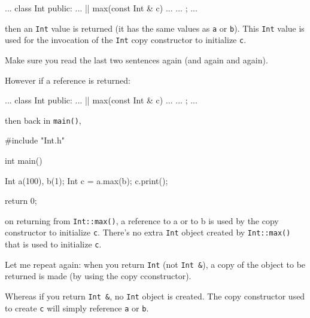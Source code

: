\begin{consolethree}[escapeinside=||]
...
class Int
{
public:
    ...
    || max(const Int & c)
    {
        ...
    }
    ...
};
...
\end{consolethree}

then an \texttt{Int} value is returned (it has the same values as \texttt{a}
or \texttt{b}). This \texttt{Int} value is used for the invocation of the
\texttt{Int} copy constructor to initialize \texttt{c}.

Make sure you read the last two sentences again (and again and again).

However if a reference is returned:

\begin{consolethree}[escapeinside=||]
...
class Int
{
public:
    ...
    || max(const Int & c)
    {
        ...
    }
    ...
};
...
\end{consolethree}

then back in \texttt{main()},
\begin{consolethree}
#include "Int.h"

int main()
{
    Int a(100), b(1);
    Int c = a.max(b);
    c.print();
    
    return 0;
}
\end{consolethree}

on returning from \texttt{Int::max()}, a reference to a or to b is used by
the copy constructor to initialize \texttt{c}. There's no
extra \texttt{Int} object created by \texttt{Int::max()} that is used to
initialize \texttt{c}.

Let me repeat again: when you return \texttt{Int} (not \texttt{Int \&}), a
copy of the object to be returned is made (by using the copy
cconstructor).
\begin{consolethree}[escapeinside=||]
...
class Int
{
public:
    ...
    || max(const Int & c)
    {||
        return (c.x > x ? c : *this);
    }
    ...
private:
\end{consolethree}
Whereas if you return \texttt{Int \&}, no \texttt{Int} object is created.
The copy constructor used to create \texttt{c} will simply reference
\texttt{a} or \texttt{b}.


